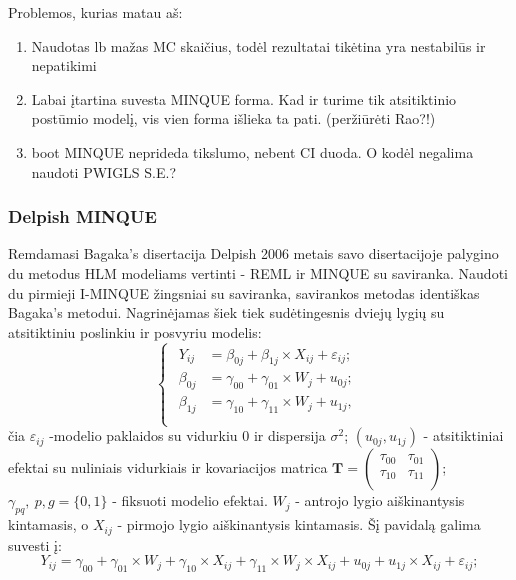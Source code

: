 \documentclass[11pt,a4paper]{article}
\begin{document}
Problemos, kurias matau aš:
\begin{enumerate}
\item Naudotas lb mažas MC skaičius, todėl rezultatai tikėtina yra nestabilūs ir nepatikimi
\item Labai įtartina suvesta MINQUE forma. Kad ir turime tik atsitiktinio postūmio modelį, vis vien forma išlieka ta pati. (peržiūrėti Rao?!)
\item boot MINQUE neprideda tikslumo, nebent CI duoda. O kodėl negalima naudoti PWIGLS S.E.?
\end{enumerate}


\subsubsection{Delpish MINQUE}

\indent Remdamasi Bagaka's disertacija Delpish 2006 metais savo disertacijoje\cite{delpish} palygino du metodus HLM modeliams vertinti - REML ir MINQUE su saviranka. Naudoti du pirmieji I-MINQUE žingsniai su saviranka, savirankos metodas identiškas Bagaka's metodui. Nagrinėjamas šiek tiek sudėtingesnis dviejų lygių su atsitiktiniu poslinkiu ir posvyriu modelis:
\begin{equation*} \label{eq:2lvldelpish}
\left\{
\begin{array}{l}
\begin{split}
Y_{ij} &= \beta_{0j}+ \beta_{1j}\times X_{ij}+\varepsilon_{ij}; \\
\beta_{0j} &= \gamma_{00} +\gamma_{01}\times W_{j}+u_{0j};\\
\beta_{1j} &= \gamma_{10} +\gamma_{11}\times W_{j}+u_{1j},\\
\end{split}
\end{array} \right.
\end{equation*}
čia $\varepsilon_{ij}$ -modelio paklaidos su vidurkiu $0$ ir dispersija $\sigma^2$; $\left(u_{0j}, u_{1j}\right)$ - atsitiktiniai efektai su nuliniais vidurkiais ir kovariacijos matrica $\mathbf{T}=\begin{pmatrix}
\tau_{00} & \tau_{01} \\
\tau_{10} & \tau_{11} \\
\end{pmatrix}$; $\gamma_{pq},\ p,g = \{0,1\}$ - fiksuoti modelio efektai. $W_j$ - antrojo lygio aiškinantysis kintamasis, o $X_{ij}$ - pirmojo lygio aiškinantysis kintamasis. Šį pavidalą galima suvesti į:
\begin{equation*} \label{eq:deq}
Y_{ij} = \gamma_{00} +\gamma_{01}\times W_{j}+ \gamma_{10}\times X_{ij}+\gamma_{11}\times W_{j}\times X_{ij}+u_{0j}+u_{1j}\times X_{ij}+\varepsilon_{ij};
\end{equation*}
\end{document}
